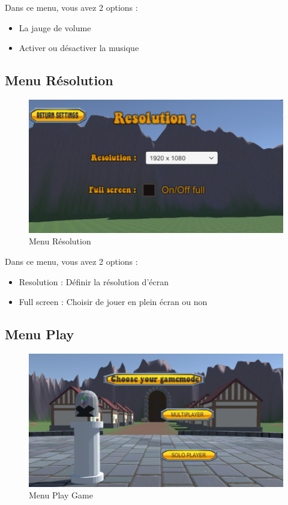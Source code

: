 \documentclass[a4paper, 11pt]{article}
\begin{document}
	\noindent Dans ce menu, vous avez 2 options : 
	\begin{itemize}
		\item La jauge de volume
		\item Activer ou désactiver la musique
	\end{itemize}
	
	\clearpage
	
	\subsection{Menu Résolution}
	\begin{figure}[!ht]
		\centering
		\includegraphics[scale=0.3]{images/resolution.png}
		\caption{Menu Résolution}
	\end{figure}
	
	\noindent Dans ce menu, vous avez 2 options :
	\begin{itemize}
		\item Resolution : Définir la résolution d'écran
		\item Full screen : Choisir de jouer en plein écran ou non
	\end{itemize}

	
	\subsection{Menu Play}
	\begin{figure}[!ht]
		\centering
		\includegraphics[scale=0.3]{images/play.png}
		\caption{Menu Play Game}
	\end{figure}
	
\end{document}
